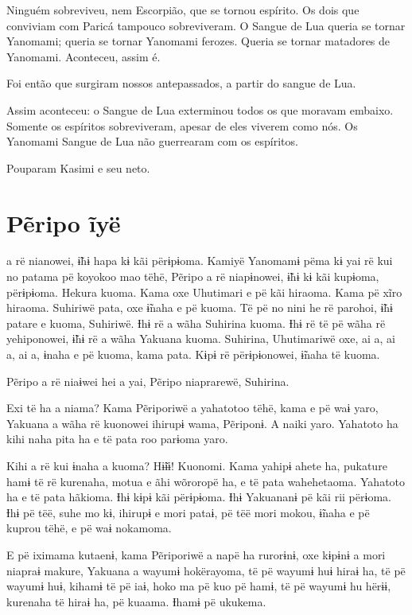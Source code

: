 Ninguém sobreviveu, nem Escorpião, que se tornou espírito. Os dois que
 conviviam com Paricá tampouco sobreviveram. O Sangue de Lua queria se
 tornar Yanomami; queria se tornar Yanomami ferozes. Queria se tornar
 matadores de Yanomami. Aconteceu, assim é.

Foi então que surgiram nossos antepassados, a partir do sangue de Lua. 

Assim aconteceu: o Sangue de Lua exterminou todos os que moravam
embaixo. Somente os espíritos sobreviveram, apesar de eles viverem como
nós. Os Yanomami Sangue de Lua não guerrearam com os espíritos.

Pouparam Kasimi e seu neto. 

\chapter{Pẽripo ĩyë}

 a rë nianowei, ɨ̃hɨ hapa kɨ kãi përɨpɨoma. Kamiyë Yanomamɨ pëma kɨ
yai rë kui no patama pë koyokoo mao tëhë, Pẽripo a rë niapɨnowei, ɨ̃hɨ kɨ
kãi kupɨoma, përɨpɨoma. Hekura kuoma. Kama oxe Uhutimari e pë kãi
hiraoma. Kama pë xĩro hiraoma. Suhiriwë pata, oxe ɨ̃naha e pë kuoma. Të
pë no nini he rë parohoi, ɨ̃hɨ patare e kuoma, Suhiriwë. Ɨhɨ rë a wãha
Suhirina kuoma. Ɨhɨ rë të pë wãha rë yehiponowei, ɨ̃hɨ rë a wãha Yakuana
kuoma. Suhirina, Uhutimariwë oxe, ai a, ai a, ai a, ɨnaha e pë kuoma,
kama pata. Kɨpɨ rë përɨpɨonowei, ɨ̃naha të kuoma.

Pẽripo a rë niaɨwei hei a yai, Pẽripo niaprarewë, Suhirina. 

Exi të ha a niama? Kama Pẽriporiwë a yahatotoo tëhë, kama e pë waɨ yaro,
 Yakuana a wãha rë kuonowei ihirupɨ wama, Pẽriponɨ. A naiki yaro.
 Yahatoto ha kihi naha pita ha e të pata roo parɨoma yaro. 

Kihi a rë kui ɨnaha a kuoma? Hɨ̃ɨɨ! Kuonomi. Kama yahipɨ ahete ha,
 pukature hamɨ të rë kurenaha, motua e ãhi wõroropë ha, e të pata
 wahehetaoma. Yahatoto ha e të pata hãkioma. Ɨhɨ kɨpɨ kãi përɨpɨoma. Ɨhɨ
 Yakuananɨ pë kãi rii përɨoma. Ɨhɨ pë tëë, suhe mo kɨ, ihirupɨ e mori
 pataɨ, pë tëë mori mokou, ɨ̃naha e pë kuprou tëhë, e pë waɨ nokamoma. 

E pë iximama kutaenɨ, kama Pẽriporiwë a napë ha rurorɨnɨ, oxe kɨpɨnɨ a
mori niapraɨ makure, Yakuana a wayumɨ hokërayoma, të pë wayumɨ huɨ hiraɨ
ha, të pë wayumɨ huɨ, kihamɨ të pë iaɨ, hoko ma pë kuo pë hamɨ, të pë
wayumɨ hu hërɨɨ, kurenaha të hiraɨ ha, pë kuaama. Ɨhamɨ pë ukukema. 

